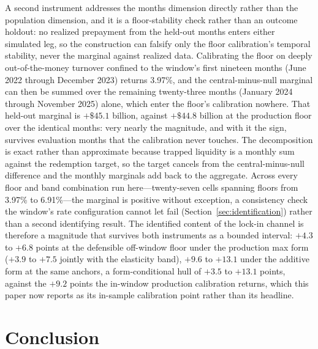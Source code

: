 \documentclass[12pt]{article}
\begin{document}
A second instrument addresses the months dimension directly rather than the population dimension, and it is a floor-stability check rather than an outcome holdout: no realized prepayment from the held-out months enters either simulated leg, so the construction can falsify only the floor calibration's temporal stability, never the marginal against realized data. Calibrating the floor on deeply out-of-the-money turnover confined to the window's first nineteen months (June 2022 through December 2023) returns 3.97\%, and the central-minus-null marginal can then be summed over the remaining twenty-three months (January 2024 through November 2025) alone, which enter the floor's calibration nowhere. That held-out marginal is $+\$45.1$ billion, against $+\$44.8$ billion at the production floor over the identical months: very nearly the magnitude, and with it the sign, survives evaluation months that the calibration never touches. The decomposition is exact rather than approximate because trapped liquidity is a monthly sum against the redemption target, so the target cancels from the central-minus-null difference and the monthly marginals add back to the aggregate. Across every floor and band combination run here---twenty-seven cells spanning floors from 3.97\% to 6.91\%---the marginal is positive without exception, a consistency check the window's rate configuration cannot let fail (Section~\ref{sec:identification}) rather than a second identifying result. The identified content of the lock-in channel is therefore a magnitude that survives both instruments as a bounded interval: $+4.3$ to $+6.8$ points at the defensible off-window floor under the production max form ($+3.9$ to $+7.5$ jointly with the elasticity band), $+9.6$ to $+13.1$ under the additive form at the same anchors, a form-conditional hull of $+3.5$ to $+13.1$ points, against the $+9.2$ points the in-window production calibration returns, which this paper now reports as its in-sample calibration point rather than its headline.


\section{Conclusion}\label{sec:conclusion}
\end{document}

